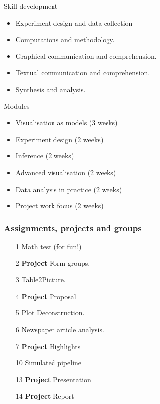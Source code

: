 \documentclass{beamer}
\begin{document}
\begin{frame}
  \begin{block}{Skill development}
    \begin{itemize}
    \item Experiment design and data collection
    \item Computations and methodology.
    \item Graphical communication and comprehension.
    \item Textual communication and comprehension.
    \item Synthesis and analysis.
    \end{itemize}
  \end{block}
  
  \begin{block}{Modules}
    \begin{itemize}
    \item Visualisation as models (3 weeks)
    \item Experiment design (2 weeks)
    \item Inference (2 weeks)
    \item Advanced visualisation (2 weeks)
    \item Data analysis in practice (2 weeks)
    \item Project work focus (2 weeks)
    \end{itemize}
  \end{block}
\end{frame}
 
\begin{frame}
  \frametitle{Assignments, projects and groups}
  \begin{enumerate}
  \item[1] Math test (for fun!)
  \item[2] \textbf{Project} Form groups.
  \item[3] Table2Picture.
  \item[4] \textbf{Project} Proposal
  \item[5] Plot Deconstruction.
  \item[6] Newspaper article analysis.
  \item[7] \textbf{Project} Highlights
  \item[10] Simulated pipeline
  \item[13] \textbf{Project} Presentation
  \item[14] \textbf{Project} Report
  \end{enumerate}
\end{frame}
\end{document}
